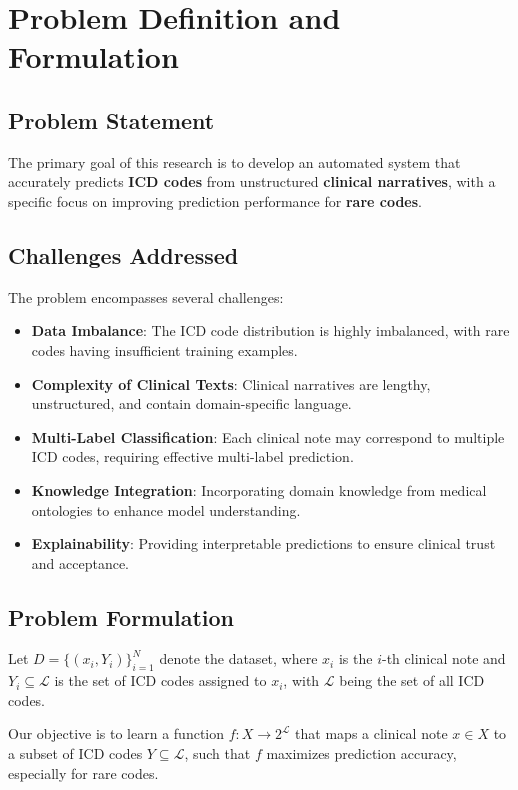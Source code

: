 \chapter{Problem Definition and Formulation}

\section{Problem Statement}
The primary goal of this research is to develop an automated system that accurately predicts \textbf{ICD codes} from unstructured \textbf{clinical narratives}, with a specific focus on improving prediction performance for \textbf{rare codes}.

\section{Challenges Addressed}
The problem encompasses several challenges:
\begin{itemize}
    \item \textbf{Data Imbalance}: The ICD code distribution is highly imbalanced, with rare codes having insufficient training examples.
    \item \textbf{Complexity of Clinical Texts}: Clinical narratives are lengthy, unstructured, and contain domain-specific language.
    \item \textbf{Multi-Label Classification}: Each clinical note may correspond to multiple ICD codes, requiring effective multi-label prediction.
    \item \textbf{Knowledge Integration}: Incorporating domain knowledge from medical ontologies to enhance model understanding.
    \item \textbf{Explainability}: Providing interpretable predictions to ensure clinical trust and acceptance.
\end{itemize}

\section{Problem Formulation}
Let \( D = \{(x_i, Y_i)\}_{i=1}^N \) denote the dataset, where \( x_i \) is the \( i \)-th clinical note and \( Y_i \subseteq \mathcal{L} \) is the set of ICD codes assigned to \( x_i \), with \( \mathcal{L} \) being the set of all ICD codes.

Our objective is to learn a function \( f: X \rightarrow 2^{\mathcal{L}} \) that maps a clinical note \( x \in X \) to a subset of ICD codes \( Y \subseteq \mathcal{L} \), such that \( f \) maximizes prediction accuracy, especially for rare codes.

